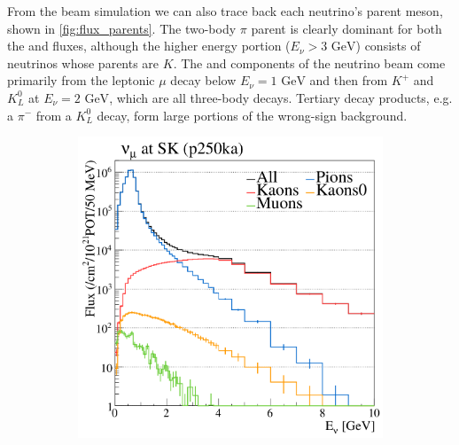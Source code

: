 From the beam simulation we can also trace back each neutrino's parent meson, shown in \autoref{fig:flux_parents}. The two-body $\pi$ parent is clearly dominant for both the \numu and \numubar fluxes, although the higher energy portion ($E_\nu > 3\text{ GeV}$) consists of neutrinos whose parents are $K$. The \nue and \nuebar components of the neutrino beam come primarily from the leptonic $\mu$ decay below $E_\nu = 1 \text{ GeV}$ and then from $K^+$ and $K^0_L$ at $E_\nu = 2 \text{ GeV}$, which are all three-body decays. Tertiary decay products, e.g. a $\pi^-$ from a $K^0_L$ decay, form large portions of the wrong-sign background.
\begin{figure}[h]
	\begin{subfigure}[t]{0.32\textwidth}
		\includegraphics[width=\textwidth, trim={0mm 0mm 0mm 0mm}, clip,page=1]{figures/det_chap/beam/numu_sk_parents}
	\end{subfigure}
	\begin{subfigure}[t]{0.32\textwidth}

\end{subfigure}
\end{figure}
